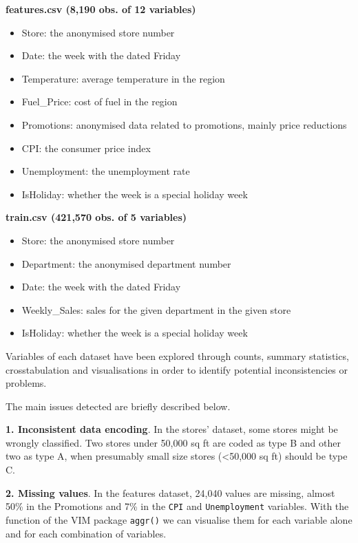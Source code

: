 \documentclass[11pt,]{article}
\providecommand{\tightlist}{%
  \setlength{\itemsep}{0pt}\setlength{\parskip}{0pt}}
\begin{document}
\textbf{features.csv (8,190 obs. of 12 variables)}

\begin{itemize}
\tightlist
\item
  Store: the anonymised store number 
\item
  Date: the week with the dated Friday 
\item
  Temperature: average temperature in the region 
\item
  Fuel\_Price: cost of fuel in the region 
\item
  Promotions: anonymised data related to promotions, mainly price
  reductions 
\item
  CPI: the consumer price index 
\item
  Unemployment: the unemployment rate 
\item
  IsHoliday: whether the week is a special holiday week 
\end{itemize}

\textbf{train.csv (421,570 obs. of 5 variables)}

\begin{itemize}
\tightlist
\item
  Store: the anonymised store number 
\item
  Department: the anonymised department number 
\item
  Date: the week with the dated Friday 
\item
  Weekly\_Sales: sales for the given department in the given store 
\item
  IsHoliday: whether the week is a special holiday week 
\end{itemize}

\pagebreak

Variables of each dataset have been explored through counts, summary
statistics, crosstabulation and visualisations in order to identify
potential inconsistencies or problems.

The main issues detected are briefly described below.

\textbf{1. Inconsistent data encoding}. In the stores' dataset, some
stores might be wrongly classified. Two stores under 50,000 sq ft are
coded as type B and other two as type A, when presumably small size
stores (\textless{}50,000 sq ft) should be type C.

\textbf{2. Missing values}. In the features dataset, 24,040 values are
missing, almost 50\% in the Promotions and 7\% in the \texttt{CPI} and
\texttt{Unemployment} variables. With the function of the VIM package
\texttt{aggr()} we can visualise them for each variable alone and for
each combination of variables.
\end{document}
